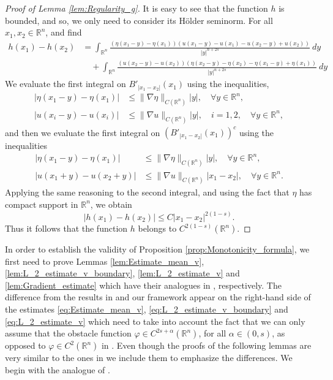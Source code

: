 \documentclass[11pt,reqno]{amsart}
\theoremstyle{definition}
\theoremstyle{remark}
\begin{document}
\begin{proof}[Proof of Lemma \ref{lem:Regularity_g}]
It is easy to see that the function $h$ is bounded, and so, we only need to consider its H\"older seminorm. For all $x_1,x_2 \in{\mathbb{R}}^n$, and find
\begin{align*}
h(x_1)-h(x_2) &= \int_{{\mathbb{R}}^n} \frac{(\eta(x_1-y)-\eta(x_1))(u(x_1-y)-u(x_1)- u(x_2-y)+u(x_2))}{|y|^{n+2s}}\ dy\\
&\quad+ \int_{{\mathbb{R}}^n} \frac{(u(x_2-y)-u(x_2))(\eta(x_2-y)-\eta(x_2)- \eta(x_1-y)+\eta(x_1))}{|y|^{n+2s}}\ dy
\end{align*}
We evaluate the first integral on $B'_{|x_1-x_2|}(x_1)$ using the inequalities, 
\begin{align*}
|\eta(x_1-y)-\eta(x_1)| &\leq \|\nabla\eta\|_{C({\mathbb{R}}^n)} |y|,\quad\forall y\in{\mathbb{R}}^n,\\
|u(x_i-y)-u(x_i)| &\leq \|\nabla u\|_{C({\mathbb{R}}^n)} |y|,\quad i=1,2, \quad\forall y\in{\mathbb{R}}^n,
\end{align*}
and then we evaluate the first integral on $(B'_{|x_1-x_2|}(x_1))^c$ using the inequalities
\begin{align*}
|\eta(x_1-y)-\eta(x_1)| &\leq \|\nabla\eta\|_{C({\mathbb{R}}^n)} |y|, \quad\forall y\in{\mathbb{R}}^n,\\
|u(x_1+y)-u(x_2+y)| &\leq \|\nabla u\|_{C({\mathbb{R}}^n)} |x_1-x_2|, \quad\forall y\in{\mathbb{R}}^n.
\end{align*}
Applying the same reasoning to the second integral, and using the fact that $\eta$ has compact support in ${\mathbb{R}}^n$, we obtain
$$
|h(x_1)-h(x_2)| \leq C|x_1-x_2|^{2(1-s)}.
$$
Thus it follows that the function $h$ belongs to $C^{2(1-s)}({\mathbb{R}}^n)$.
\end{proof}

In order to establish the validity of Proposition \ref{prop:Monotonicity_formula}, we first need to prove Lemmas \ref{lem:Estimate_mean_v}, \ref{lem:L_2_estimate_v_boundary}, \ref{lem:L_2_estimate_v} and \ref{lem:Gradient_estimate} which have their analogues in \cite[Lemma 2.9, Lemma 2.13, Corollary 2.15 and Lemma 7.8]{Caffarelli_Salsa_Silvestre_2008}, respectively. The difference from the results in \cite{Caffarelli_Salsa_Silvestre_2008} and our framework appear on the right-hand side of the estimates \eqref{eq:Estimate_mean_v}, \eqref{eq:L_2_estimate_v_boundary} and \eqref{eq:L_2_estimate_v} which need to take into account the fact that we can only assume that the obstacle function $\varphi \in C^{2s+\alpha}({\mathbb{R}}^n)$, for all $\alpha\in (0,s)$, as opposed to $\varphi\in C^2({\mathbb{R}}^n)$ in \cite{Caffarelli_Salsa_Silvestre_2008}. Even though the proofs of the following lemmas are very similar to the ones in \cite{Caffarelli_Salsa_Silvestre_2008} we include them to emphasize the differences. We begin with the analogue of \cite[Lemma 2.9]{Caffarelli_Salsa_Silvestre_2008}.
\end{document}
